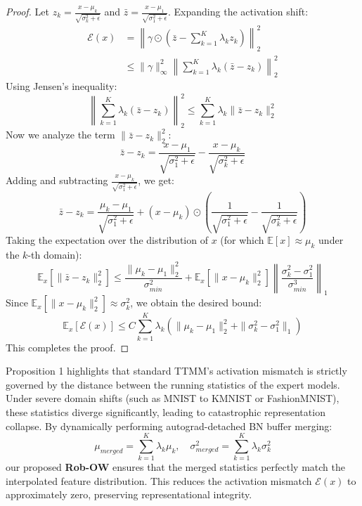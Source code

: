 \documentclass{article}
\begin{document}
\begin{proof}
Let $z_k = \frac{x - \mu_k}{\sqrt{\sigma_k^2 + \epsilon}}$ and $\bar{z} = \frac{x - \mu_1}{\sqrt{\sigma_1^2 + \epsilon}}$. Expanding the activation shift:
\begin{align*}
\mathcal{E}(x) &= \left\| \gamma \odot \left( \bar{z} - \sum_{k=1}^K \lambda_k z_k \right) \right\|_2^2 \\
&\leq \|\gamma\|_\infty^2 \left\| \sum_{k=1}^K \lambda_k (\bar{z} - z_k) \right\|_2^2
\end{align*}
Using Jensen's inequality:
\begin{equation*}
\left\| \sum_{k=1}^K \lambda_k (\bar{z} - z_k) \right\|_2^2 \leq \sum_{k=1}^K \lambda_k \|\bar{z} - z_k\|_2^2
\end{equation*}
Now we analyze the term $\|\bar{z} - z_k\|_2^2$:
\begin{equation*}
\bar{z} - z_k = \frac{x - \mu_1}{\sqrt{\sigma_1^2 + \epsilon}} - \frac{x - \mu_k}{\sqrt{\sigma_k^2 + \epsilon}}
\end{equation*}
Adding and subtracting $\frac{x - \mu_k}{\sqrt{\sigma_1^2 + \epsilon}}$, we get:
\begin{equation*}
\bar{z} - z_k = \frac{\mu_k - \mu_1}{\sqrt{\sigma_1^2 + \epsilon}} + (x - \mu_k) \odot \left( \frac{1}{\sqrt{\sigma_1^2 + \epsilon}} - \frac{1}{\sqrt{\sigma_k^2 + \epsilon}} \right)
\end{equation*}
Taking the expectation over the distribution of $x$ (for which $\mathbb{E}[x] \approx \mu_k$ under the $k$-th domain):
\begin{equation*}
\mathbb{E}_x[\|\bar{z} - z_k\|_2^2] \leq \frac{\|\mu_k - \mu_1\|_2^2}{\sigma_{min}^2} + \mathbb{E}_x[\|x - \mu_k\|_2^2] \left\| \frac{\sigma_k^2 - \sigma_1^2}{\sigma_{min}^3} \right\|_1
\end{equation*}
Since $\mathbb{E}_x[\|x - \mu_k\|_2^2] \approx \sigma_k^2$, we obtain the desired bound:
\begin{equation*}
\mathbb{E}_x[\mathcal{E}(x)] \leq C \sum_{k=1}^K \lambda_k \left( \|\mu_k - \mu_1\|_2^2 + \|\sigma_k^2 - \sigma_1^2\|_1 \right)
\end{equation*}
This completes the proof.
\end{proof}

Proposition 1 highlights that standard TTMM's activation mismatch is strictly governed by the distance between the running statistics of the expert models. Under severe domain shifts (such as MNIST to KMNIST or FashionMNIST), these statistics diverge significantly, leading to catastrophic representation collapse. By dynamically performing autograd-detached BN buffer merging:
\begin{equation}
\mu_{merged} = \sum_{k=1}^K \lambda_k \mu_k, \quad \sigma^2_{merged} = \sum_{k=1}^K \lambda_k \sigma^2_k
\end{equation}
our proposed \textbf{Rob-OW} ensures that the merged statistics perfectly match the interpolated feature distribution. This reduces the activation mismatch $\mathcal{E}(x)$ to approximately zero, preserving representational integrity.
\end{document}

